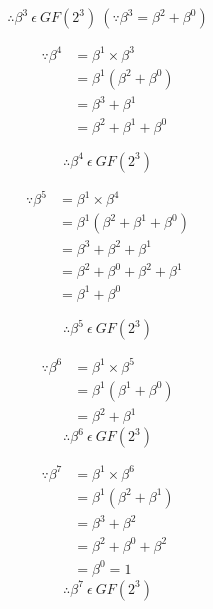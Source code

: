 \documentclass[paper=usletter, fontsize=12pt]{article}
\begin{document}
            \[ \therefore \beta^{3} \ \epsilon \ GF(2^{3}) \ (\because \beta^{3}=\beta^{2}+\beta^{0}) \]

            \begin{equation*}
                \begin{split}
                    \because \beta^{4} & = \beta^{1} \times \beta^{3} \\
                    & = \beta^{1} (\beta^{2}+\beta^{0}) \\
                    & = \beta^{3}+\beta^{1} \\
                    & = \beta^{2}+\beta^{1}+\beta^{0}
                \end{split}
            \end{equation*}

            \[ \therefore \beta^{4} \ \epsilon \ GF(2^{3}) \]

            \begin{equation*}
                \begin{split}
                    \because \beta^{5} & = \beta^{1} \times \beta^{4} \\
                    & = \beta^{1} (\beta^{2}+\beta^{1}+\beta^{0}) \\
                    & = \beta^{3}+\beta^{2}+\beta^{1} \\
                    & = \beta^{2}+\beta^{0}+\beta^{2}+\beta^{1} \\
                    & = \beta^{1}+\beta^{0}
                \end{split}
            \end{equation*}

            \[ \therefore \beta^{5} \ \epsilon \ GF(2^{3}) \]

            \begin{equation*}
                \begin{split}
                    \because \beta^{6} & = \beta^{1} \times \beta^{5} \\
                    & = \beta^{1} (\beta^{1}+\beta^{0}) \\
                    & = \beta^{2}+\beta^{1}
                \end{split}
            \end{equation*}
            \[ \therefore \beta^{6} \ \epsilon \ GF(2^{3}) \]

            \begin{equation*}
                \begin{split}
                    \because \beta^{7} & = \beta^{1} \times \beta^{6} \\
                    & = \beta^{1} (\beta^{2}+\beta^{1}) \\
                    & = \beta^{3}+\beta^{2} \\
                    & = \beta^{2}+\beta^{0}+\beta^{2} \\
                    & = \beta^{0} = 1
                \end{split}
            \end{equation*}
            \[ \therefore \beta^{7} \ \epsilon \ GF(2^{3}) \]
\end{document}
